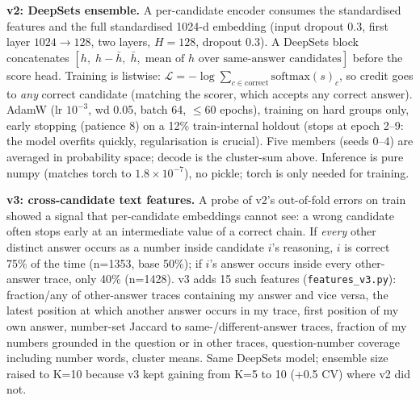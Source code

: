 \documentclass[10pt,a4paper]{article}
\begin{document}
\textbf{v2: DeepSets ensemble.} A per-candidate encoder consumes the standardised features and the full standardised 1024-d embedding (input dropout 0.3, first layer $1024\to128$, two layers, $H=128$, dropout 0.3). A DeepSets block concatenates $[h,\;h-\bar h,\;\bar h,\;\text{mean of }h\text{ over same-answer candidates}]$ before the score head. Training is listwise: $\mathcal L=-\log\sum_{c\in\text{correct}}\mathrm{softmax}(s)_c$, so credit goes to \emph{any} correct candidate (matching the scorer, which accepts any correct answer). AdamW (lr $10^{-3}$, wd 0.05, batch 64, $\le60$ epochs), training on hard groups only, early stopping (patience 8) on a 12\% train-internal holdout (stops at epoch 2--9: the model overfits quickly, regularisation is crucial). Five members (seeds 0--4) are averaged in probability space; decode is the cluster-sum above. Inference is pure numpy (matches torch to $1.8\times10^{-7}$), no pickle; torch is only needed for training.

\textbf{v3: cross-candidate text features.} A probe of v2's out-of-fold errors on train showed a signal that per-candidate embeddings cannot see: a wrong candidate often stops early at an intermediate value of a correct chain. If \emph{every} other distinct answer occurs as a number inside candidate $i$'s reasoning, $i$ is correct 75\% of the time (n=1353, base 50\%); if $i$'s answer occurs inside every other-answer trace, only 40\% (n=1428). v3 adds 15 such features (\texttt{features\_v3.py}): fraction/any of other-answer traces containing my answer and vice versa, the latest position at which another answer occurs in my trace, first position of my own answer, number-set Jaccard to same-/different-answer traces, fraction of my numbers grounded in the question or in other traces, question-number coverage including number words, cluster means. Same DeepSets model; ensemble size raised to K=10 because v3 kept gaining from K=5 to 10 (+0.5 CV) where v2 did not.
\end{document}
